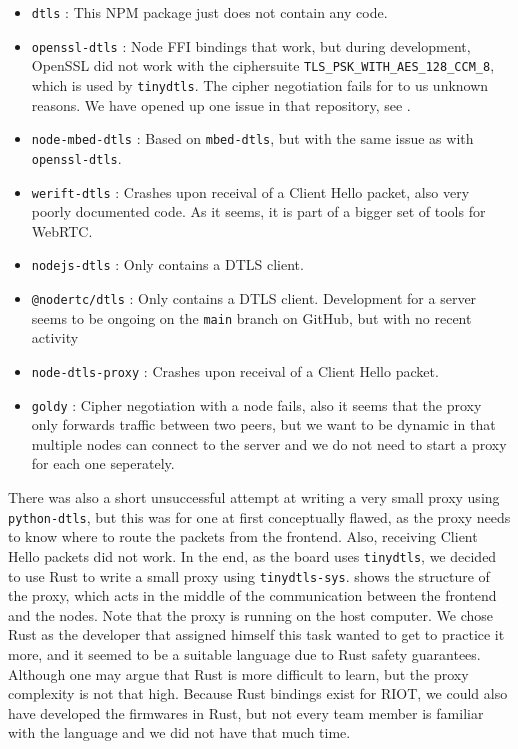 \documentclass[acmtog, language=english, nonacm]{acmart}
\begin{document}
    \begin{itemize}
        \item \texttt{dtls} \cite{npm-dtls}: This NPM package just does not contain any code.
        \item \texttt{openssl-dtls} \cite{npm-openssl-dtls}: Node FFI bindings that work, but during development, OpenSSL did not work with the ciphersuite \texttt{TLS\_PSK\_WITH\_AES\_128\_CCM\_8}, which is used by \texttt{tinydtls}. The cipher negotiation fails for to us unknown reasons. We have opened up one issue in that repository, see \cite{node-openssl-dtls-issue}.
        \item \texttt{node-mbed-dtls} \cite{npm-node-mbed-dtls}: Based on \texttt{mbed-dtls}, but with the same issue as with \texttt{openssl-dtls}.
        \item \texttt{werift-dtls} \cite{npm-werift-dtls}: Crashes upon receival of a Client Hello packet, also very poorly documented code. As it seems, it is part of a bigger set of tools for WebRTC.
        \item \texttt{nodejs-dtls} \cite{npm-nodejs-dtls}: Only contains a DTLS client.
        \item \texttt{@nodertc/dtls} \cite{npm-nodertc-dtls}: Only contains a DTLS client. Development for a server seems to be ongoing on the \texttt{main} branch on GitHub, but with no recent activity
        \item \texttt{node-dtls-proxy} \cite{npm-node-dtls-proxy}: Crashes upon receival of a Client Hello packet.
        \item \texttt{goldy} \cite{github-goldy}: Cipher negotiation with a node fails, also it seems that the proxy only forwards traffic between two peers, but we want to be dynamic in that multiple nodes can connect to the server and we do not need to start a proxy for each one seperately.
    \end{itemize}

    There was also a short unsuccessful attempt at writing a very small proxy using \texttt{python-dtls}, but this was for one at first conceptually flawed, as the proxy needs to know where to route the packets from the frontend. Also, receiving Client Hello packets did not work. In the end, as the board uses \texttt{tinydtls}, we decided to use Rust to write a small proxy using \texttt{tinydtls-sys}.  shows the structure of the proxy, which acts in the middle of the communication between the frontend and the nodes. Note that the proxy is running on the host computer. We chose Rust as the developer that assigned himself this task wanted to get to practice it more, and it seemed to be a suitable language due to Rust safety guarantees. Although one may argue that Rust is more difficult to learn, but the proxy complexity is not that high. Because Rust bindings exist for RIOT, we could also have developed the firmwares in Rust, but not every team member is familiar with the language and we did not have that much time.
\end{document}
